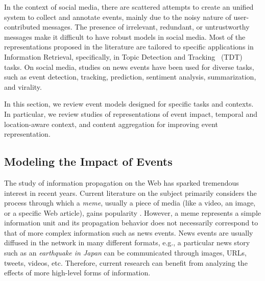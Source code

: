 In the context of social media, there are scattered attempts to create an
unified system to collect and annotate events, mainly due to the noisy nature of
user-contributed messages.
%
The presence of irrelevant, redundant, or untrustworthy messages make it
difficult to have robust models in social media.
%
Most of the representations proposed in the literature are tailored to specific
applications in Information Retrieval, specifically, in Topic Detection and
Tracking~\cite{allan2012topic} (TDT) tasks.
%
On social media, studies on news events have been used for diverse tasks,
such as event detection, tracking, prediction, sentiment analysis,
summarization, and virality. 
%

In this section, we review event models designed for specific tasks and
contexts. 
%
In particular, we review studies of representations of event impact, temporal
and location-aware context, and content aggregation for improving event
representation.


\subsection{Modeling the Impact of Events}

The study of information propagation on the Web has sparked tremendous interest
in recent years. 
%
Current literature on the subject primarily considers the process through which
a {\em meme}, usually a piece of media (like a video, an image, or a specific
Web article), gains popularity
\cite{Castillo:2014,Szabo:2010,Lerman:2010,Tatar2014,Pinto:2013,Ahmed:2013,Li:2016:concept:drift,
Liu:2015:UN}. 
%
However, a meme represents a simple information unit and its propagation
behavior does not necessarily correspond to that of more complex information
such as news events. 
%
News events are usually diffused in the network in many different formats, e.g.,
a particular news story such as an {\em earthquake in Japan} can be communicated
through images, URLs, tweets, videos, etc. 
%
Therefore, current research can benefit from analyzing the effects of more
high-level forms of information. 

